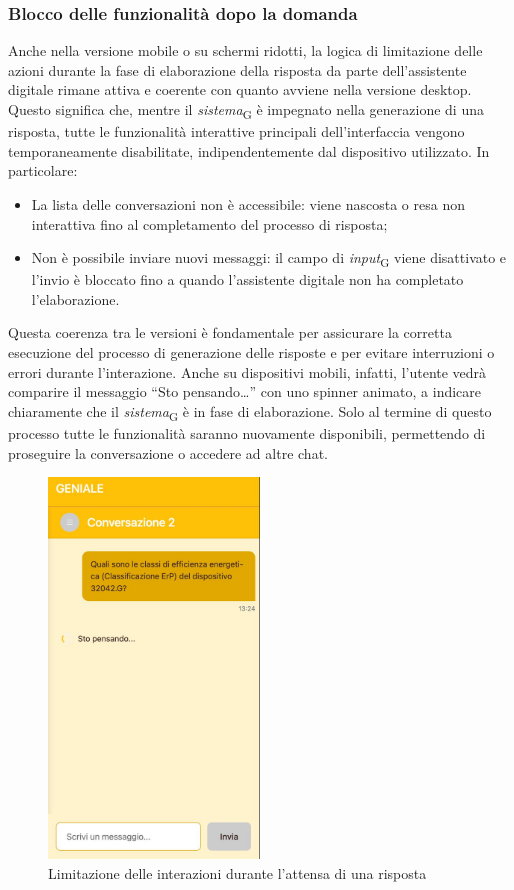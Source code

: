 \subsubsection{Blocco delle funzionalità dopo la domanda}
Anche nella versione mobile o su schermi ridotti, la logica di limitazione delle azioni durante la fase di elaborazione della risposta da parte dell’assistente digitale rimane attiva e coerente con quanto avviene nella versione desktop. Questo significa che, mentre il \textit{sistema}\textsubscript{G} è impegnato nella generazione di una risposta, tutte le funzionalità interattive principali dell’interfaccia vengono temporaneamente disabilitate, indipendentemente dal dispositivo utilizzato. In particolare:
\begin{itemize}
    \item La lista delle conversazioni non è accessibile: viene nascosta o resa non interattiva fino al completamento del processo di risposta;
    \item Non è possibile inviare nuovi messaggi: il campo di \textit{input}\textsubscript{G} viene disattivato e l’invio è bloccato fino a quando l’assistente digitale non ha completato l’elaborazione.
\end{itemize}
Questa coerenza tra le versioni è fondamentale per assicurare la corretta esecuzione del processo di generazione delle risposte e per evitare interruzioni o errori durante l’interazione. Anche su dispositivi mobili, infatti, l’utente vedrà comparire il messaggio “Sto pensando…” con uno spinner animato, a indicare chiaramente che il \textit{sistema}\textsubscript{G} è in fase di elaborazione. Solo al termine di questo processo tutte le funzionalità saranno nuovamente disponibili, permettendo di proseguire la conversazione o accedere ad altre chat.
\begin{figure}[H]
\centering
\includegraphics[width=0.5\textwidth]{contents/img/lock_mobile.jpg}
\caption{Limitazione delle interazioni durante l'attensa di una risposta}
\end{figure}